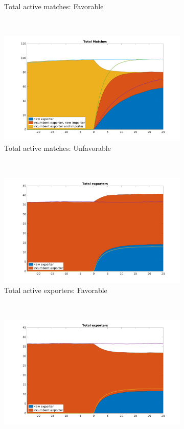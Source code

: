 \documentclass[12pt]{article}
\begin{document}
\begin{figure}[tbp]
\begin{subfigure}[b]{0.45\textwidth}
        \caption{Total active matches: Favorable}
    \end{subfigure} ~ 
\begin{subfigure}[b]{0.45\textwidth}
        \centering
        \includegraphics[width=\textwidth]{figures/total_matches_unf}
        \caption{Total active matches: Unfavorable}
    \end{subfigure} \newline
~ 
\begin{subfigure}[b]{0.45\textwidth}
        \centering
        \includegraphics[width=\textwidth]{figures/total_firms}
        \caption{Total active exporters: Favorable}
    \end{subfigure} ~ 
\begin{subfigure}[b]{0.45\textwidth}
        \centering
        \includegraphics[width=\textwidth]{figures/total_firms_unf}

\end{subfigure}
\end{figure}
\end{document}
